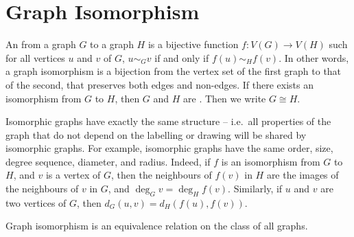 \section{Graph Isomorphism}\label{sec:Isomorphism}

An  from a graph $G$ to a graph $H$ is a bijective function $f \colon V(G) \to V(H)$ such for all vertices $u$ and $v$ of $G$, $u \sim_G v$ if and only if $f(u) \sim_H f(v)$. In other words, a graph isomorphism is a bijection from the vertex set of the first graph to that of the second, that preserves both edges and non-edges. If there exists an isomorphism from $G$ to $H$, then $G$ and $H$ are . Then we write $G \cong H$.

Isomorphic graphs have exactly the same structure -- i.e.\ all properties of the graph that do not depend on the labelling or drawing will be shared by isomorphic graphs. For example, isomorphic graphs have the same order, size, degree sequence, diameter, and radius. Indeed, if $f$ is an isomorphism from $G$ to $H$, and $v$ is a vertex of $G$, then the neighbours of $f(v)$ in $H$ are the images of the neighbours of $v$ in $G$, and $\deg_G v = \deg_H f(v)$. Similarly, if $u$ and $v$ are two vertices of $G$, then $d_G(u, v) = d_H(f(u), f(v))$.

\begin{Theorem}
Graph isomorphism is an equivalence relation on the class of all graphs.
\end{Theorem}

